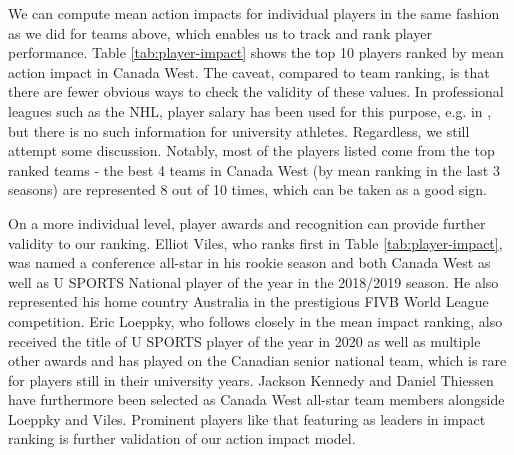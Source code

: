 \documentclass{sfuthesis}
\begin{document}
	We can compute mean action impacts for individual players in the same fashion as we did for teams above, which enables us to track and rank player performance. Table \ref{tab:player-impact} shows the top 10 players ranked by mean action impact in Canada West. The caveat, compared to team ranking, is that there are fewer obvious ways to check the validity of these values. In professional leagues such as the NHL, player salary has been used for this purpose, e.g. in \cite{schulte2017apples}, but there is no such information for university athletes. Regardless, we still attempt some discussion. Notably, most of the players listed come from the top ranked teams - the best 4 teams in Canada West (by mean ranking in the last 3 seasons) are represented 8 out of 10 times, which can be taken as a good sign.
	
	On a more individual level, player awards and recognition can provide further validity to our ranking. Elliot Viles, who ranks first in Table \ref{tab:player-impact}, was named a conference all-star in his rookie season and both Canada West as well as U SPORTS National player of the year in the 2018/2019 season. He also represented his home country Australia in the prestigious FIVB World League competition. Eric Loeppky, who follows closely in the mean impact ranking, also received the title of U SPORTS player of the year in 2020 as well as multiple other awards and has played on the Canadian senior national team, which is rare for players still in their university years. Jackson Kennedy and Daniel Thiessen have furthermore been selected as Canada West all-star team members alongside Loeppky and Viles. Prominent players like that featuring as leaders in impact ranking is further validation of our action impact model.
\end{document}
